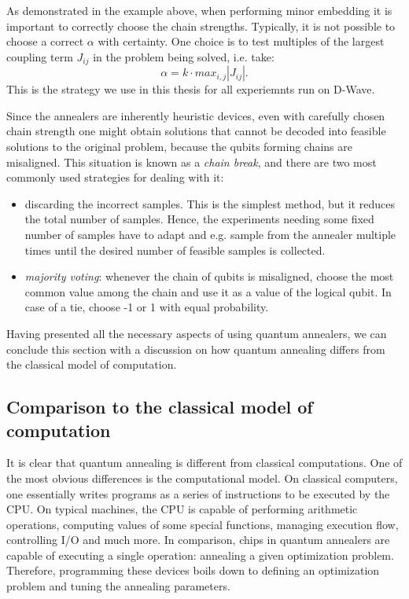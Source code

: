 As demonstrated in the example above, when performing minor embedding it is important to correctly
choose the chain strengths. Typically, it is not possible to choose a correct $\alpha$ with
certainty. One choice is to test multiples of the largest coupling term
$J_{ij}$ in the problem being solved, i.e. take:
\begin{equation}
\alpha = k \cdot max_{i, j} |J_{ij}|.
\end{equation}
This is the strategy we use in this thesis for all experiemnts run on D-Wave.

Since the annealers are inherently heuristic devices, even with carefully chosen chain strength one
might obtain solutions that cannot be decoded into feasible solutions to the original problem,
because the qubits forming chains are misaligned. This situation is known as a \emph{chain break},
and there are two most commonly used strategies for dealing with it:

\begin{itemize}
\item discarding the incorrect samples. This is the simplest method, but it reduces the total number
of samples. Hence, the experiments needing some fixed number of samples have to adapt and e.g.
sample from the annealer multiple times until the desired number of feasible samples is collected.
\item \emph{majority voting}: whenever the chain of qubits is misaligned, choose the most common value
among the chain and use it as a value of the logical qubit. In case of a tie, choose
-1 or 1 with equal probability.
\end{itemize}

Having presented all the necessary aspects of using quantum annealers, we can conclude this section
with a discussion on how quantum annealing differs from the classical model of computation.

\subsection{Comparison to the classical model of computation}
It is clear that quantum annealing is different from classical computations. One of the
most obvious differences is the computational model. On classical computers, one essentially writes
programs as a series of instructions to be executed by the CPU. On typical machines, the CPU is
capable of performing arithmetic operations, computing values of some special functions, managing
execution flow, controlling I/O and much more. In comparison, chips in quantum annealers are capable
of executing a single operation: annealing a given optimization problem. Therefore, programming
these devices boils down to defining an optimization problem and tuning the annealing parameters.

